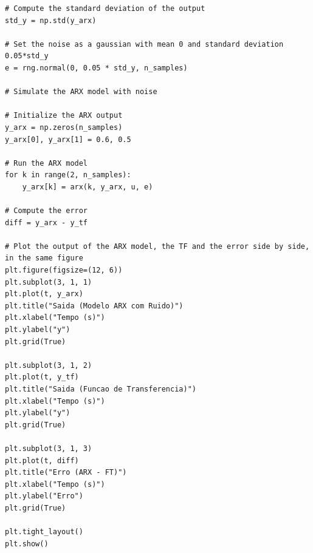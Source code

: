 \documentclass{article}
\begin{document}
\begin{lstlisting}[caption={Simula e plota a resposta do modelo ARX com ruído}, label={lst:simula_arx_ruido}]
# Compute the standard deviation of the output
std_y = np.std(y_arx)

# Set the noise as a gaussian with mean 0 and standard deviation 0.05*std_y
e = rng.normal(0, 0.05 * std_y, n_samples)

# Simulate the ARX model with noise

# Initialize the ARX output
y_arx = np.zeros(n_samples)
y_arx[0], y_arx[1] = 0.6, 0.5

# Run the ARX model
for k in range(2, n_samples):
    y_arx[k] = arx(k, y_arx, u, e)

# Compute the error
diff = y_arx - y_tf

# Plot the output of the ARX model, the TF and the error side by side, in the same figure
plt.figure(figsize=(12, 6))
plt.subplot(3, 1, 1)
plt.plot(t, y_arx)
plt.title("Saida (Modelo ARX com Ruido)")
plt.xlabel("Tempo (s)")
plt.ylabel("y")
plt.grid(True)

plt.subplot(3, 1, 2)
plt.plot(t, y_tf)
plt.title("Saida (Funcao de Transferencia)")
plt.xlabel("Tempo (s)")
plt.ylabel("y")
plt.grid(True)

plt.subplot(3, 1, 3)
plt.plot(t, diff)
plt.title("Erro (ARX - FT)")
plt.xlabel("Tempo (s)")
plt.ylabel("Erro")
plt.grid(True)

plt.tight_layout()
plt.show()
\end{lstlisting}
\end{document}
